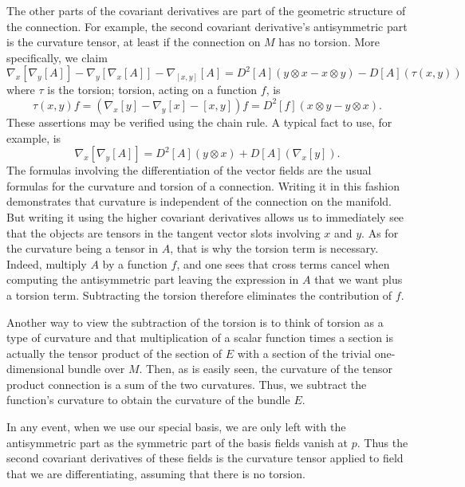 \documentclass[11pt]{article}
\theoremstyle{remark}
\begin{document}
The other parts of the covariant derivatives are part of the geometric
structure of the connection. For example, the second covariant
derivative's antisymmetric part is the curvature tensor, at least if
the connection on $M$ has no torsion. More specifically, we claim
\[
\ensuremath{{{\nabla}}_{x}^{}{[\ensuremath{{{\nabla}}_{y}^{}{[A]}}{}]}} - \ensuremath{{{\nabla}}_{y}^{}{[\ensuremath{{{\nabla}}_{x}^{}{[A]}}{}]}}
- \ensuremath{{{\nabla}}_{[x,y]}^{}{[A]}} 
=
D^2[A] (y\otimes x -x \otimes y) - D[A] (\tau(x, y))
\]
where $\tau$ is the torsion; torsion, acting on a function $f$, is 
\[
\tau(x,y)f = (\ensuremath{{{\nabla}}_{x}^{}{[y]}} - \ensuremath{{{\nabla}}_{y}^{}{[x]}} -[x,y])f 
= D^2[f](x\otimes y -y \otimes x).
\]
These assertions may be verified using the chain rule. A typical fact
to use, for example, is
\[
\ensuremath{{{\nabla}}_{x}^{}{[\ensuremath{{{\nabla}}_{y}^{}{[A]}}{}]}} =  
D^2 [A] (y \otimes x) + D[A](\ensuremath{{{\nabla}}_{x}^{}{[y]}}).
\]
The formulas involving the differentiation of the vector fields are
the usual formulas for the curvature and torsion of a
connection. Writing it in this fashion demonstrates that curvature is
independent of the connection on the manifold. But writing it using
the higher covariant derivatives allows us to immediately see that the
objects are tensors in the tangent vector slots involving $x$ and
$y$. As for the curvature being a tensor in $A$, that is why the
torsion term is necessary. Indeed, multiply $A$ by a function $f$, and
one sees that cross terms cancel when computing the antisymmetric part
leaving the expression in $A$ that we want plus a torsion
term. Subtracting the torsion therefore eliminates the contribution of
$f$. 

Another way to view the subtraction of the torsion
 is to think of torsion as a type of
curvature and that multiplication of a scalar function times a section
is actually the tensor product of the section of $E$ with a section of
the trivial one-dimensional bundle over $M$. Then, as is easily seen,
the curvature of the tensor product connection  is a sum of the two
 curvatures. Thus, we subtract the function's curvature to obtain the
 curvature of the bundle $E$. 

In any event, when we use our special basis, we are only left with the
antisymmetric part  as the symmetric part of
the basis fields vanish at $p$. Thus the second covariant derivatives of these
fields is the curvature tensor applied to field that we are
differentiating, assuming that there is no torsion. 
\end{document}
